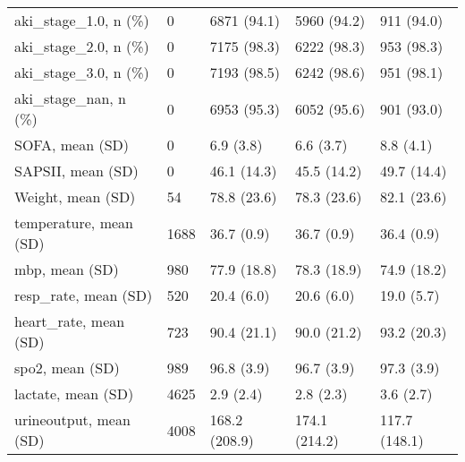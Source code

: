 \begin{tabular}{lllll}
aki\_stage\_1.0, n (\%)                              &                              0 &    6871 (94.1) &       5960 (94.2) &             911 (94.0) \\
aki\_stage\_2.0, n (\%)                              &                              0 &    7175 (98.3) &       6222 (98.3) &             953 (98.3) \\
aki\_stage\_3.0, n (\%)                              &                              0 &    7193 (98.5) &       6242 (98.6) &             951 (98.1) \\
aki\_stage\_nan, n (\%)                              &                              0 &    6953 (95.3) &       6052 (95.6) &             901 (93.0) \\
SOFA, mean (SD)                                   &                              0 &      6.9 (3.8) &         6.6 (3.7) &              8.8 (4.1) \\
SAPSII, mean (SD)                                 &                              0 &    46.1 (14.3) &       45.5 (14.2) &            49.7 (14.4) \\
Weight, mean (SD)                                 &                             54 &    78.8 (23.6) &       78.3 (23.6) &            82.1 (23.6) \\
temperature, mean (SD)                            &                           1688 &     36.7 (0.9) &        36.7 (0.9) &             36.4 (0.9) \\
mbp, mean (SD)                                    &                            980 &    77.9 (18.8) &       78.3 (18.9) &            74.9 (18.2) \\
resp\_rate, mean (SD)                              &                            520 &     20.4 (6.0) &        20.6 (6.0) &             19.0 (5.7) \\
heart\_rate, mean (SD)                             &                            723 &    90.4 (21.1) &       90.0 (21.2) &            93.2 (20.3) \\
spo2, mean (SD)                                   &                            989 &     96.8 (3.9) &        96.7 (3.9) &             97.3 (3.9) \\
lactate, mean (SD)                                &                           4625 &      2.9 (2.4) &         2.8 (2.3) &              3.6 (2.7) \\
urineoutput, mean (SD)                            &                           4008 &  168.2 (208.9) &     174.1 (214.2) &          117.7 (148.1) \\

\end{tabular}
